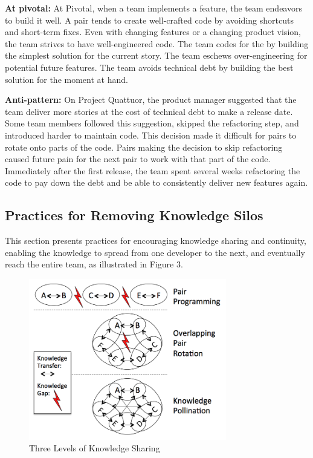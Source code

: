\begin{table}[]
\textbf{At pivotal:} At Pivotal, when a team implements a feature, the team endeavors to build it well. A pair tends to create well-crafted code by avoiding shortcuts and short-term fixes. Even with changing features or a changing product vision, the team strives to have well-engineered code. The team codes for the  by building the simplest solution for the current story. The team eschews over-engineering for potential future features. The team avoids technical debt by building the best solution for the moment at hand.  

\textbf{Anti-pattern:} On Project Quattuor, the product manager suggested that the team deliver more stories at the cost of technical debt to make a release date. Some team members followed this suggestion, skipped the refactoring step, and introduced harder to maintain code. This decision made it difficult for pairs to rotate onto parts of the code. Pairs making the decision to skip refactoring caused future pain for the next pair to work with that part of the code. Immediately after the first release, the team spent several weeks refactoring the code to pay down the debt and be able to consistently deliver new features again.  
\subsection{Practices for Removing Knowledge Silos}
This section presents practices for encouraging knowledge sharing and continuity, enabling the knowledge to spread from one developer to the next, and eventually reach the entire team, as illustrated in Figure 3.

\begin{figure}[t]
\centering
\includegraphics[width=3.4in]{KnowledgeSharingLevels.png}
\caption{Three Levels of Knowledge Sharing}
\label{KnowledgeSharing}
\end{figure}


\end{table}
